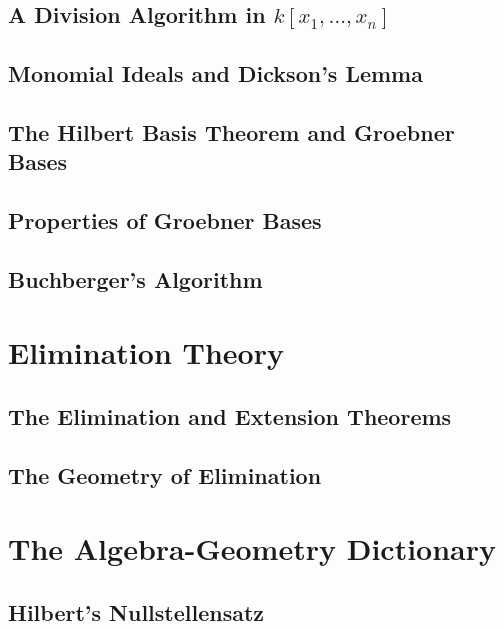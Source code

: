 \documentclass[twoside]{amsart}
\theoremstyle{plain}
\theoremstyle{definition}
\begin{document}
\subsection{A Division Algorithm in $k[x_1, \dots , x_n ]$ }



\subsection{Monomial Ideals and Dickson's Lemma }


\subsection{The Hilbert Basis Theorem and Groebner Bases}


\subsection{Properties of Groebner Bases}



\subsection{Buchberger's Algorithm}






\section{Elimination Theory}



\subsection{The Elimination and Extension Theorems}


\subsection{The Geometry of Elimination}



\section{The Algebra-Geometry Dictionary}


\subsection{Hilbert's Nullstellensatz}
\end{document}
